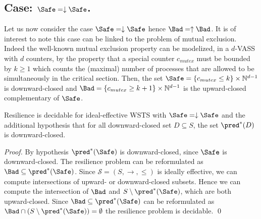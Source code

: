 

\subsection{Case: $\Safe=\downarrow \Safe$.}\label{safe-down}
%
%

Let us now consider the case $\Safe=\downarrow \Safe$ hence $\Bad=\uparrow \Bad$.
It is of interest to note this case can be linked to the problem of mutual exclusion.
Indeed the well-known mutual exclusion property can be modelized, in a $d$-VASS with $d$ counters, by the property that a special counter $c_{mutex}$ must be bounded by $k \geq 1$ which counts the (maximal) number of processes that are allowed to be simultaneously in the critical section. Then, the set $\Safe =  \{c_{mutex} \leq k\} \times \mathbb{N}^{d-1}$ is downward-closed		and $\Bad =\{c_{mutex} \geq k+1\} \times  \mathbb{N}^{d-1} $ is the upward-closed complementary of $\Safe$. 




%
\begin{theorem}\label{up-down}
{\sc Resilience}  is decidable for ideal-effective WSTS with 
$\Safe=\downarrow \Safe$
and
the additional hypothesis that
for all downward-closed set $D \subseteq S$, the set $\pred^*(D)$ is downward-closed.
\end{theorem}

\begin{proof}
By hypothesis $\pred^*(\Safe)$ is downward-closed, since $\Safe$ is downward-closed.
The resilience problem can be reformulated as 
$\Bad \subseteq  \pred^*(\Safe)$.
Since $\mathscr{S}=(S,\rightarrow, \leq)$ is ideally effective, we can compute intersections of upward- or downward-closed 
 subsets.
Hence we can compute the intersection of
$\Bad$
and
$S \setminus \pred^*(\Safe)$,
which are both upward-closed.
Since
$\Bad \subseteq \pred^*(\Safe)$
can be reformulated as
$\Bad \cap (S \setminus \pred^*(\Safe)) = \emptyset$
the resilience problem is decidable. \qed
\end{proof}

